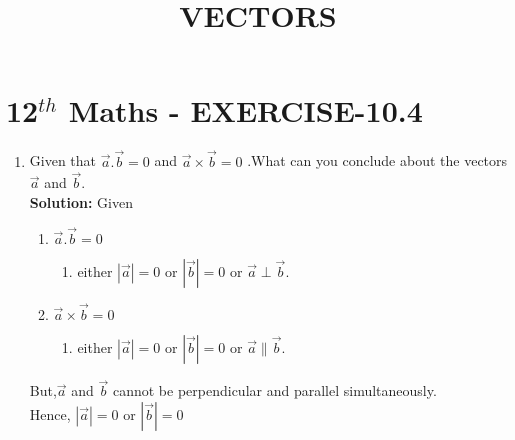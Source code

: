\documentclass[10pt]{article}
\newcommand{\solution}{\noindent \textbf{Solution: }}
\providecommand{\abs}[1]{\left\vert#1\right\vert}
\begin{document}
\begin{center}
\title{\textbf{VECTORS}}
\date{\vspace{-5ex}} %
\maketitle
\end{center}

\section{12$^{th}$ Maths - EXERCISE-10.4}

\begin{enumerate}
\item Given that $\overrightarrow{a}.\overrightarrow{b}=0$ and $\overrightarrow{a}\times\overrightarrow{b}=0$ .What can you conclude about the vectors $\overrightarrow{a}$ and $\overrightarrow{b}$.\\  

\solution
Given  

\begin{enumerate}
\item $\overrightarrow{a}.\overrightarrow{b}=0$
\begin{enumerate}
\item either $\abs{\overrightarrow{a}}=0$ or $\abs{\overrightarrow{b}}=0$ or $\overrightarrow{a}\perp\overrightarrow{b}$.
\end{enumerate}
\item $\overrightarrow{a}\times\overrightarrow{b}=0$
\begin{enumerate}
\item either $\abs{\overrightarrow{a}}=0$ or $\abs{\overrightarrow{b}}=0$ or  $\overrightarrow{a}\parallel\overrightarrow{b}$.
\end{enumerate}
\end{enumerate}
But,$\overrightarrow{a}$ and $\overrightarrow{b}$ cannot be perpendicular and parallel simultaneously.\\
Hence, $\abs{\overrightarrow{a}}=0$ or $\abs{\overrightarrow{b}}=0$

\end{enumerate}
\end{document}
